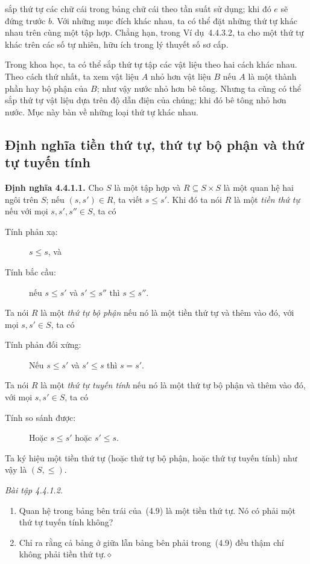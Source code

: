 sắp thứ tự các chữ cái trong bảng chữ cái theo tần suất sử dụng; khi đó $e$ sẽ đứng trước $b$. Với những mục đích khác nhau, ta có thể đặt những thứ tự khác nhau trên cùng một tập hợp. Chẳng hạn, trong Ví dụ~4.4.3.2, ta cho một thứ tự khác trên các số tự nhiên, hữu ích trong lý thuyết số sơ cấp.

Trong khoa học, ta có thể sắp thứ tự tập các vật liệu theo hai cách khác nhau. Theo cách thứ nhất, ta xem vật liệu $A$ nhỏ hơn vật liệu $B$ nếu $A$ là một thành phần hay bộ phận của $B$; như vậy nước nhỏ hơn bê tông. Nhưng ta cũng có thể sắp thứ tự vật liệu dựa trên độ dẫn điện của chúng; khi đó bê tông nhỏ hơn nước. Mục này bàn về những loại thứ tự khác nhau.

\subsection{Định nghĩa tiền thứ tự, thứ tự bộ phận và thứ tự tuyến tính}

\noindent\textbf{Định nghĩa 4.4.1.1.} Cho $S$ là một tập hợp và $R\subseteq S\times S$ là một quan hệ hai ngôi trên $S$; nếu $(s,s')\in R$, ta viết $s\le s'$. Khi đó ta nói $R$ là một \emph{tiền thứ tự} nếu với mọi $s,s',s''\in S$, ta có
\begin{description}
\item[Tính phản xạ:] $s\le s$, và
\item[Tính bắc cầu:] nếu $s\le s'$ và $s'\le s''$ thì $s\le s''$.
\end{description}
Ta nói $R$ là một \emph{thứ tự bộ phận} nếu nó là một tiền thứ tự và thêm vào đó, với mọi $s,s'\in S$, ta có
\begin{description}
\item[Tính phản đối xứng:] Nếu $s\le s'$ và $s'\le s$ thì $s=s'$.
\end{description}
Ta nói $R$ là một \emph{thứ tự tuyến tính} nếu nó là một thứ tự bộ phận và thêm vào đó, với mọi $s,s'\in S$, ta có
\begin{description}
\item[Tính so sánh được:] Hoặc $s\le s'$ hoặc $s'\le s$.
\end{description}
Ta ký hiệu một tiền thứ tự (hoặc thứ tự bộ phận, hoặc thứ tự tuyến tính) như vậy là $(S,\le)$.

\noindent\textit{Bài tập 4.4.1.2.}\keepwithnext
\begin{enumerate}[label=\alph*.]
\item Quan hệ trong bảng bên trái của~(4.9) là một tiền thứ tự. Nó có phải một thứ tự tuyến tính không?
\item Chỉ ra rằng cả bảng ở giữa lẫn bảng bên phải trong~(4.9) đều thậm chí không phải tiền thứ tự.\nobreak\hfill$\diamond$
\end{enumerate}

